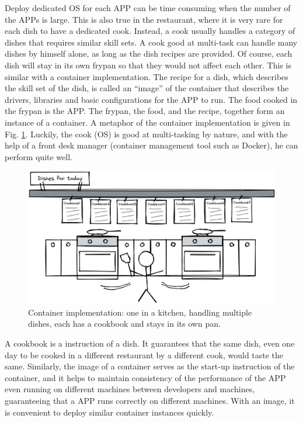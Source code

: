 Deploy dedicated OS for each APP can be time consuming when the number of the APPs is large. This is also true in the restaurant, where it is very rare for each dish to have a dedicated cook. Instead, a cook usually handles a category of dishes that requires similar skill sets. A cook good at multi-task can handle many dishes by himself alone, as long as the dish recipes are provided. Of course, each dish will stay in its own frypan so that they would not affect each other. This is similar with a container implementation. The recipe for a dish, which describes the skill set of the dish, is called an ``image'' of the container that describes the drivers, libraries and basic configurations for the APP to run. The food cooked in the frypan is the APP. The frypan, the food, and the recipe, together form an instance of a container. A metaphor of the container implementation is given in Fig. \ref{ch:vac:fig:multitaskcook}. Luckily, the cook (OS) is good at multi-tasking by nature, and with the help of a front desk manager (container management tool such as Docker), he can perform quite well.
\begin{figure}
	\centering
	\includegraphics[width=350pt]{chapters/ch_virtualization_and_containerization/figures/multitaskcook.png}
	\caption{Container implementation: one in a kitchen, handling multiple dishes, each has a cookbook and stays in its own pan.} \label{ch:vac:fig:multitaskcook}
\end{figure}

A cookbook is a instruction of a dish. It guarantees that the same dish, even one day to be cooked in a different restaurant by a different cook, would taste the same. Similarly, the image of a container serves as the start-up instruction of the container, and it helps to maintain consistency of the performance of the APP even running on different machines between developers and machines, guaranteeing that a APP runs correctly on different machines. With an image, it is convenient to deploy similar container instances quickly.

